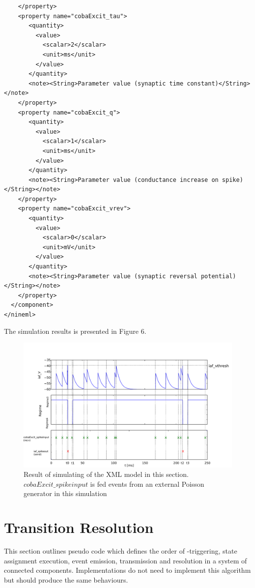 \documentclass[draftspec]{ninemlspec}
\newcommand{\Transition}{\textbf{\class{Transition}}\xspace}
\begin{document}
\begin{lstlisting}
    </property>
    <property name="cobaExcit_tau">
       <quantity>
         <value>
           <scalar>2</scalar>
           <unit>ms</unit>
         </value>
       </quantity>
       <note><String>Parameter value (synaptic time constant)</String></note>
    </property>
    <property name="cobaExcit_q">
       <quantity>
         <value>
           <scalar>1</scalar>
           <unit>ms</unit>
         </value>
       </quantity>
       <note><String>Parameter value (conductance increase on spike)</String></note>
    </property>
    <property name="cobaExcit_vrev">
       <quantity>
         <value>
           <scalar>0</scalar>
           <unit>mV</unit>
         </value>
       </quantity>
       <note><String>Parameter value (synaptic reversal potential)</String></note>
    </property>
  </component>
</nineml>
\end{lstlisting}

The simulation results is presented in Figure 6.
\begin{figure}[htb!]
\center
\includegraphics[width=14cm]{figures/demo2_Coba1_out.pdf}
\protect\caption{Result of simulating of the XML model in this section.
$cobaExcit\_spikeinput$ is fed events from an external Poisson generator
in this simulation}
\label{fig:EX2_Output}
\end{figure}

\pagebreak

\newpage

\section{Transition Resolution}
\label{resolution}

This section outlines pseudo code which defines the order of
\Transition-triggering, state assignment execution, event emission,
transmission and resolution in a system of connected components.
Implementations do not need to implement this algorithm but should produce
the same behaviours.
\end{document}
